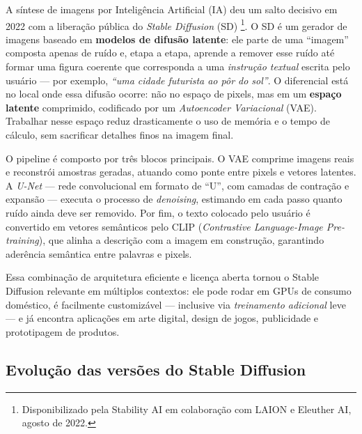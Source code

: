 \documentclass[12pt, %
openright, 
oneside, %
a4paper,    %
brazil]{facom-ufu-abntex2}
\begin{document}
A síntese de imagens por Inteligência Artificial (IA) deu um salto decisivo em 2022
com a liberação pública do \textit{Stable Diffusion} (SD) \cite{rombach2022highresolutionimagesynthesislatent}\footnote{Disponibilizado pela Stability AI em colaboração com LAION e Eleuther AI, agosto de 2022.}.
O SD é um gerador de imagens baseado em \textbf{modelos de difusão latente}:
ele parte de uma ``imagem'' composta apenas de ruído e, etapa a etapa, aprende a
remover esse ruído até formar uma figura coerente que corresponda a uma
\emph{instrução textual} escrita pelo usuário — por exemplo, \emph{``uma cidade
futurista ao pôr do sol''}.
O diferencial está no local onde essa difusão ocorre: não no espaço de pixels,
mas em um \textbf{espaço latente} comprimido, codificado por um
\emph{Autoencoder Variacional} (VAE).  Trabalhar nesse espaço reduz
drasticamente o uso de memória e o tempo de cálculo, sem sacrificar detalhes
finos na imagem final.

O pipeline é composto por três blocos principais.  
O VAE comprime imagens reais e reconstrói amostras geradas, atuando
como ponte entre pixels e vetores latentes.  
A \emph{U-Net} — rede convolucional em formato de ``U'', com camadas de
contração e expansão — executa o processo de \emph{denoising}, estimando em
cada passo quanto ruído ainda deve ser removido.  
Por fim, o texto colocado pelo usuário é convertido em vetores semânticos pelo
CLIP (\emph{Contrastive Language-Image Pre-training}), que alinha a
descrição com a imagem em construção, garantindo aderência semântica entre
palavras e pixels.

Essa combinação de arquitetura eficiente e licença aberta tornou o Stable
Diffusion relevante em múltiplos contextos: ele pode rodar em GPUs de consumo
doméstico, é facilmente customizável — inclusive via \emph{treinamento
adicional} leve — e já encontra aplicações em arte digital, design de jogos,
publicidade e prototipagem de produtos.

\subsection*{Evolução das versões do Stable Diffusion}
\end{document}

